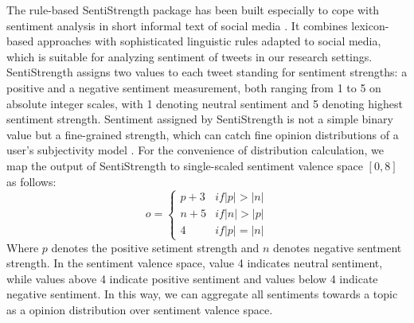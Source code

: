 \documentclass[smallcondensed]{svjour3}     %
\begin{document}
The rule-based SentiStrength package has been built especially to cope with sentiment analysis in short informal text of social media \cite{Thelwall:2010SSS}.
It combines lexicon-based approaches with sophisticated linguistic rules adapted to social media, which is suitable for analyzing sentiment of tweets in our research settings.
SentiStrength assigns two values to each tweet standing for sentiment strengths: a positive and a negative sentiment measurement, both ranging from 1 to 5 on absolute integer scales, with 1 denoting neutral sentiment and 5 denoting highest sentiment strength.
Sentiment assigned by SentiStrength is not a simple binary value but a fine-grained strength, which can catch fine opinion distributions of a user's subjectivity model . 
For the convenience of distribution calculation, we map the output of SentiStrength to single-scaled sentiment valence space $ \left[ 0, 8 \right] $ as follows:
\begin{equation}
\label{opinionmap}
o= \left\{ 
\begin{array}{lll}
{p+3} & if \vert p \vert > \vert n \vert \\
{n+5} & if  \vert n \vert > \vert p \vert \\
{4}  &  if  \vert p \vert = \vert n \vert
\end{array}
\right.
\end{equation}
Where $ p $ denotes the positive setiment strength and $ n $ denotes negative sentment strength.
In the sentiment valence space, value 4 indicates neutral sentiment, while values above 4 indicate positive sentiment and values below 4 indicate negative sentiment. In this way, we can aggregate all sentiments towards a topic as a opinion distribution over sentiment valence space.
\end{document}
